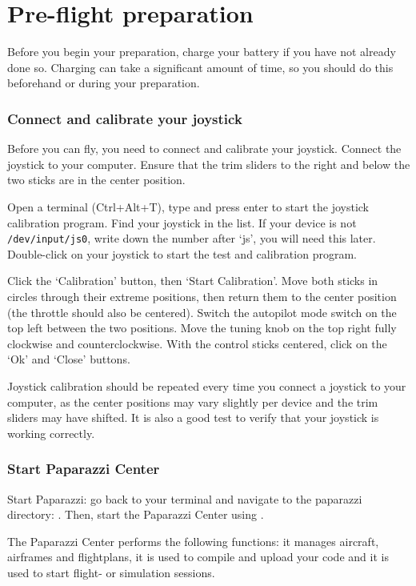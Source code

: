 \documentclass{article}
\begin{document}
\section{Pre-flight preparation}
Before you begin your preparation, charge your battery if you have not already done so. Charging can take a significant amount of time, so you should do this beforehand or during your preparation.

\subsubsection*{Connect and calibrate your joystick}
Before you can fly, you need to connect and calibrate your joystick.
Connect the joystick to your computer. Ensure that the trim sliders to the right and below the two sticks are in the center position.

Open a terminal (Ctrl+Alt+T), type  and press enter to start the joystick calibration program. Find your joystick in the list. If your device is not \verb"/dev/input/js0", write down the number after `js', you will need this later. Double-click on your joystick to start the test and calibration program.

Click the `Calibration' button, then `Start Calibration'. Move both sticks in circles through their extreme positions, then return them to the center position (the throttle should also be centered). Switch the autopilot mode switch on the top left between the two positions. Move the tuning knob on the top right fully clockwise and counterclockwise. With the control sticks centered, click on the `Ok' and `Close' buttons.

Joystick calibration should be repeated every time you connect a joystick to your computer, as the center positions may vary slightly per device and the trim sliders may have shifted. It is also a good test to verify that your joystick is working correctly.

\subsubsection*{Start Paparazzi Center}
Start Paparazzi: go back to your terminal and navigate to the paparazzi directory: . Then, start the Paparazzi Center using .

\medskip
The Paparazzi Center performs the following functions: it manages aircraft, airframes and flightplans, it is used to compile and upload your code and it is used to start flight- or simulation sessions.
\end{document}
